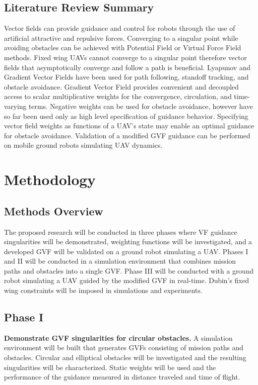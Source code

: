 \documentclass[numbered,pdftex]{ohio-etd}
\begin{document}
\section{Literature Review Summary}


Vector fields can provide guidance and control for robots through the use of artificial attractive and repulsive forces. Converging to a singular point while avoiding obstacles can be achieved with Potential Field or Virtual Force Field methods. Fixed wing UAVs cannot converge to a singular point therefore vector fields that asymptotically converge and follow a path is beneficial. Lyapunov and Gradient Vector Fields have been used for path following, standoff tracking, and obstacle avoidance. Gradient Vector Field provides convenient and decoupled access to scalar multiplicative weights for the convergence, circulation, and time-varying terms. Negative weights can be used for obstacle avoidance, however have so far been used only as high level specification of guidance behavior. Specifying vector field weights as functions of a UAV's state may enable an optimal guidance for obstacle avoidance. Validation of a modified GVF guidance can be performed on mobile ground robots simulating UAV dynamics.

\chapter{Methodology}
\section{Methods Overview}
The proposed research will be conducted in three phases where VF guidance  singularities will be demonstrated, weighting functions will be investigated, and a developed GVF will be validated on a ground robot simulating a UAV.  Phases I and II will be conducted in a simulation environment that combines mission paths and obstacles into a single GVF. Phase III will be conducted with a ground robot simulating a UAV guided by the modified GVF in real-time. Dubin's fixed wing constraints will be imposed in simulations and experiments. 


\section{Phase I}
\textbf{Demonstrate GVF singularities for circular obstacles.} A simulation environment will be built that generates GVFs consisting of mission paths and obstacles. Circular and elliptical obstacles will be investigated and the resulting singularities will be characterized. Static weights will be used and the performance of the guidance measured in distance traveled and time of flight. 
\end{document}
